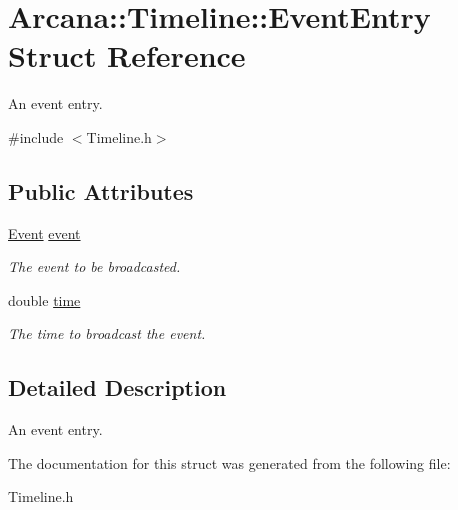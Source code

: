 \hypertarget{struct_arcana_1_1_timeline_1_1_event_entry}{}\section{Arcana\+:\+:Timeline\+:\+:Event\+Entry Struct Reference}
\label{struct_arcana_1_1_timeline_1_1_event_entry}


An event entry.  




{\ttfamily \#include $<$Timeline.\+h$>$}

\subsection*{Public Attributes}
\begin{DoxyCompactItemize}
\item 
\mbox{\label{struct_arcana_1_1_timeline_1_1_event_entry_ac7ab2ec2e47ffc38027df2e5dde49a49}} 
\mbox{\hyperlink{class_arcana_1_1_event}{Event}} \mbox{\hyperlink{struct_arcana_1_1_timeline_1_1_event_entry_ac7ab2ec2e47ffc38027df2e5dde49a49}{event}}
\begin{DoxyCompactList}\small\item\em The event to be broadcasted. \end{DoxyCompactList}\item 
\mbox{\label{struct_arcana_1_1_timeline_1_1_event_entry_af46b4681e90bd97293fc5f68eb514136}} 
double \mbox{\hyperlink{struct_arcana_1_1_timeline_1_1_event_entry_af46b4681e90bd97293fc5f68eb514136}{time}}
\begin{DoxyCompactList}\small\item\em The time to broadcast the event. \end{DoxyCompactList}\end{DoxyCompactItemize}


\subsection{Detailed Description}
An event entry. 

The documentation for this struct was generated from the following file\+:\begin{DoxyCompactItemize}
\item 
Timeline.\+h\end{DoxyCompactItemize}
